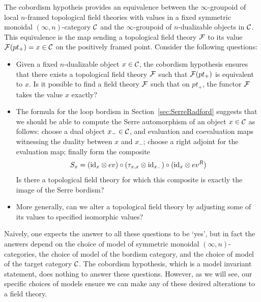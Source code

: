 \documentclass{amsart}
\begin{document}
The cobordism hypotheis provides an equivalence between the $\infty$-groupoid of local $n$-framed topological field theories with values in a fixed symmetric monoidal $(\infty,n)$-category $\mathcal C$ and the $\infty$-groupoid of $n$-dualizable objects in $\mathcal C$. This equivalence is the map sending a topological field theory $\mathcal F$ to its value $\mathcal F(pt_+) = x \in \mathcal C$ on the positively framed point. Consider the following questions:
\begin{itemize}
	\item Given a fixed $n$-dualizable object $x \in \mathcal C$, the cobordism hypothesis ensures that 
	there exists a topological field theory $\mathcal F$ such that $\mathcal F(pt_+)$ is equivalent to $x$. Is it possible to find a field theory $\mathcal F$ such that on $pt_+$, the functor $\mathcal F$ takes the value $x$ exactly? 
	\item The formula for the loop bordism in Section~\ref{sec:SerreRadford} suggests that we should be able to compute the Serre automorphism of an object $x \in \mathcal C$ as follows: choose a dual object $x_- \in \mathcal C$, and evaluation and coevaluation maps witnessing the duality between $x$ and $x_-$; choose a right adjoint for the evaluation map; finally form the composite
	\begin{equation*}
		S_x = (\mathrm{id}_{x} \otimes ev) \circ (\tau_{x, x} \otimes \mathrm{id}_{x_-}) \circ (\mathrm{id}_{x} \otimes ev^R)
	\end{equation*}
Is there a topological field theory for which this composite is exactly the image of the Serre bordism? 
	\item More generally, can we alter a topological field theory by adjusting some of its values to specified isomorphic values?
\end{itemize}
\nid Naively, one expects the answer to all these questions to be `yes', but in fact the answers depend on the choice of model of symmetric monoidal $(\infty,n)$-categories, the choice of model of the bordism category, and the choice of model of the target category $\mathcal C$.  The cobordism hypothesis, which is a model invariant statement, does nothing to answer these questions.  However, as we will see, our specific choices of models ensure we can make any of these desired alterations to a field theory.
\end{document}
